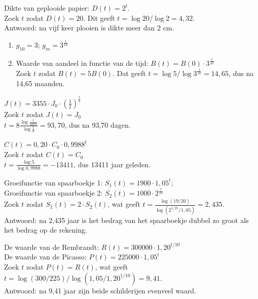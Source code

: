 \begin{Oplossing}{6.2}
     Dikte van geplooide papier: $D(t)=2^t$.\\
     Zoek $t$ zodat $D(t)=20$. Dit geeft $t=\log20/\log 2=4,32$.\\
     Antwoord: na vijf keer plooien is dikte meer dan 2 cm.
     
\end{Oplossing}
\begin{Oplossing}{6.3}
      \begin{enumerate}
      \item $g_{10}=3$; $g_m=3^\frac{1}{10}$
      \item Waarde van aandeel in functie van de tijd: $B(t)=B(0)\cdot 3^\frac{t}{10}$ \\
      Zoek $t$ zodat $B(t)=5B(0)$. Dat geeft $t=\log5/\log3^\frac{1}{10}=14,65$, dus na 14,65 maanden.
      \end{enumerate}
      
\end{Oplossing}
\begin{Oplossing}{6.4}
      $J(t)=3355\cdot J_0\cdot \left( \frac12\right)^\frac{t}{8}$\\
      Zoek $t$ zodat $J(t)=J_0$\\
      $t=8\frac{\log \frac{1}{3355}}{\log\frac12}=93,70$, dus na 93,70 dagen.
      
\end{Oplossing}
\begin{Oplossing}{6.5}
    $C(t)=0,20\cdot C_0\cdot 0,9988^t$\\
    Zoek $t$ zodat $C(t)=C_0$\\
    $t=\frac{\log5}{\log0,9988}=-13411$, dus 13411 jaar geleden.
    
\end{Oplossing}
\begin{Oplossing}{6.6}
Groeifunctie van spaarboekje 1: $S_1(t)=1900\cdot 1,05^t$; \\Groeifunctie van spaarboekje 2: $S_2(t)=1000\cdot 2^\frac{t}{25}$\\
Zoek $t$ zodat $S_1(t)=2\cdot S_2(t)$, wat geeft $t=\frac{\log(19/20)}{\log(2^{1/25}/1,05)}=2,435$.\\
Antwoord: na 2,435 jaar is het bedrag van het spaarboekje dubbel zo groot als het bedrag op de rekening.
\end{Oplossing}
\begin{Oplossing}{6.7}
         De waarde van de Rembrandt: $R(t)=300000\cdot 1,20^{t/10}$\\
         De waarde van de Picasso: $P(t)=225000\cdot 1,05^t$\\
         Zoek $t$ zodat $P(t)=R(t)$, wat geeft $t=\log(300/225)/\log(1,05/1,20^{1/10})=9,41$.\\
         Antwoord: na 9,41 jaar zijn beide schilderijen evenveel waard.
      
\end{Oplossing}
